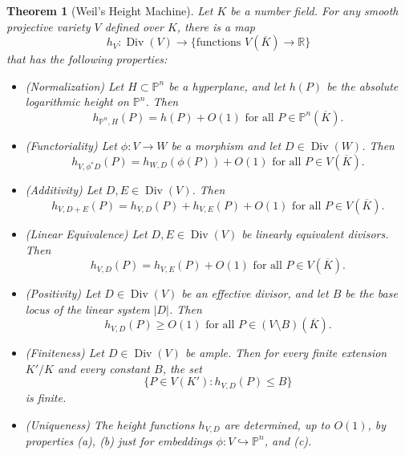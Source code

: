 \documentclass[a4paper, 12pt]{amsart}
\theoremstyle{definition}
\theoremstyle{plain}
\theoremstyle{plain}
\newtheorem{thm0}[defn0]{Theorem}
\theoremstyle{plain}
\theoremstyle{plain}
\theoremstyle{remark}
\theoremstyle{remark}
\theoremstyle{plain}
\newenvironment{theorem}{ \begin{thm0}}{\end{thm0}}
\DeclareMathOperator{\Div}{Div}
\begin{document}
	\begin{theorem}[Weil's Height Machine]\label{heightmachine}
		Let $K$ be a number field. For any smooth projective variety $V$ defined over $K$, there is a map
		\begin{equation*}
			h_V:\Div(V)\rightarrow\{\text{functions }V(\overline{K})\rightarrow \mathbb{R}\}
		\end{equation*}
		that has the following properties:
		\begin{itemize}
			\item[(a)](Normalization) Let $H\subset\mathbb{P}^n$ be a hyperplane, and let $h(P)$ be the absolute logarithmic height on $\mathbb{P}^n$. Then
			\begin{equation*}
				h_{\mathbb{P}^n,H}(P)=h(P)+O(1)\text{ for all } P\in\mathbb{P}^n(\overline{K}).
			\end{equation*}
			\item[(b)](Functoriality) Let $\phi:V\rightarrow W$ be a morphism and let $D\in\Div(W)$. Then
			\begin{equation*}
				h_{V,\phi^*D}(P)=h_{W,D}(\phi(P))+O(1)\text{ for all }P\in V(\overline{K}).
			\end{equation*}
			\item[(c)](Additivity) Let $D,E\in\Div(V)$. Then
			\begin{equation*}
				h_{V,D+E}(P)=h_{V,D}(P)+h_{V,E}(P)+O(1)\text{ for all }P\in V(\overline{K}).
			\end{equation*}
			\item[(d)](Linear Equivalence) Let $D,E\in\Div(V)$ be linearly equivalent divisors. Then
			\begin{equation*}
				h_{V,D}(P)=h_{V,E}(P)+O(1)\text{ for all }P\in V(\overline{K}).
			\end{equation*}
			\item[(e)](Positivity) Let $D\in\Div(V)$ be an effective divisor, and let $B$ be the base locus of the linear system $|D|$. Then
			\begin{equation*}
				h_{V,D}(P)\ge O(1)\text{ for all }P\in (V\setminus B)(\overline{K}).
			\end{equation*}
			\item[(f)](Finiteness) Let $D\in\Div(V)$ be ample. Then for every finite extension $K'/K$ and every constant $B$, the set
			\begin{equation*}
				\{P\in V(K'):h_{V,D}(P)\le B\}
			\end{equation*}
			is finite.
			\item[(g)](Uniqueness) The height functions $h_{V,D}$ are determined, up to $O(1)$, by properties (a), (b) just for embeddings $\phi:V\hookrightarrow\mathbb{P}^n$, and (c).
		\end{itemize}
	\end{theorem}
\end{document}
